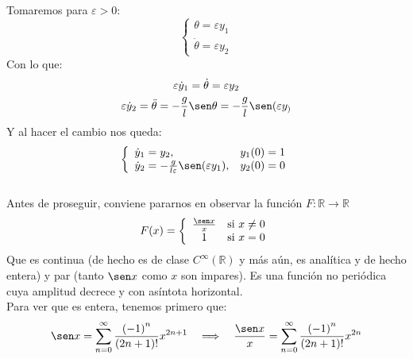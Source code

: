 \noindent
Tomaremos para $\varepsilon>0$:
\begin{equation*}
    \left\{\begin{array}{l}
        \theta = \varepsilon y_1 \\
        \dot{\theta} = \varepsilon y_2
    \end{array}\right.
\end{equation*}
Con lo que:
\begin{gather*}
    \varepsilon\dot{y}_1 = \dot{\theta} = \varepsilon y_2 \\
    \varepsilon \dot{y}_2 = \ddot{\theta} = -\frac{g}{l}\sen\theta = -\frac{g}{l}\sen(\varepsilon y_)
\end{gather*}
Y al hacer el cambio nos queda:
\begin{equation*}
    \left\{\begin{array}{ll}
        \dot{y}_1 = y_2, & y_1(0) = 1 \\
        \dot{y}_2 = -\frac{g}{l\varepsilon}\sen(\varepsilon y_1), & y_2(0) = 0
    \end{array}\right.
\end{equation*}~\\

\noindent
Antes de proseguir, conviene pararnos en observar la función $F:\mathbb{R}\to\mathbb{R}$
\begin{equation*}
    F(x) = \left\{\begin{array}{cl}
        \frac{\sen x}{x} & \text{si\ } x\neq 0 \\
        1 & \text{si\ } x = 0
    \end{array}\right. 
\end{equation*}
Que es continua (de hecho es de clase $C^\infty(\mathbb{R})$ y más aún, es analítica y de hecho entera) y par (tanto $\sen x$ como $x$ son impares). Es una función no periódica cuya amplitud decrece y con asíntota horizontal.\\

\noindent
Para ver que es entera, tenemos primero que:
\begin{equation*}
    \sen x = \sum_{n=0}^{\infty} \frac{{(-1)}^{n}}{(2n+1)!}x^{2n+1} \quad\Longrightarrow\quad \frac{\sen x}{x} = \sum_{n=0}^{\infty} \frac{{(-1)}^{n}}{(2n+1)!}x^{2n}
\end{equation*}~\\

